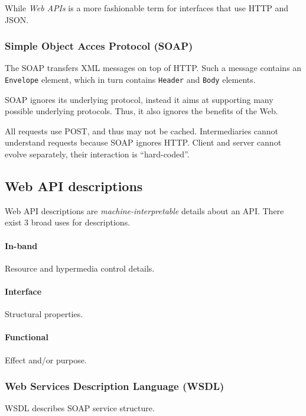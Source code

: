 \documentclass{report}
\begin{document}
While \emph{Web APIs} is a more fashionable term
for interfaces that use HTTP and JSON.

\subsubsection{Simple Object Acces Protocol (SOAP)}

The SOAP transfers XML messages on top of HTTP.
Such a message contains an \texttt{Envelope} element,
which in turn contains \texttt{Header} and \texttt{Body} elements.

SOAP ignores its underlying protocol,
instead it aims at supporting many possible underlying protocols.
Thus, it also ignores the benefits of the Web.

All requests use POST, and thus may not be cached.
Intermediaries cannot understand requests because SOAP ignores HTTP.
Client and server cannot evolve separately,
their interaction is ``hard-coded''.

\subsection{Web API descriptions}

Web API descriptions are \emph{machine-interpretable} details about an API.
There exist 3 broad uses for descriptions.

\paragraph{In-band}

Resource and hypermedia control details.

\paragraph{Interface}

Structural properties.

\paragraph{Functional}

Effect and/or purpose.

\subsubsection{Web Services Description Language (WSDL)}

WSDL describes SOAP service structure.
\end{document}
